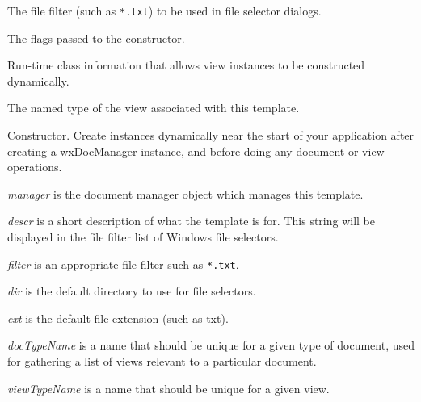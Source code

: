 
The file filter (such as \verb$*.txt$) to be used in file selector dialogs.



The flags passed to the constructor.



Run-time class information that allows view instances to be constructed dynamically.



The named type of the view associated with this template.



Constructor. Create instances dynamically near the start of your application after creating
a wxDocManager instance, and before doing any document or view operations.

{\it manager} is the document manager object which manages this template.

{\it descr} is a short description of what the template is for. This string will be displayed in the
file filter list of Windows file selectors.

{\it filter} is an appropriate file filter such as \verb$*.txt$.

{\it dir} is the default directory to use for file selectors.

{\it ext} is the default file extension (such as txt).

{\it docTypeName} is a name that should be unique for a given type of document, used for
gathering a list of views relevant to a particular document.

{\it viewTypeName} is a name that should be unique for a given view.

